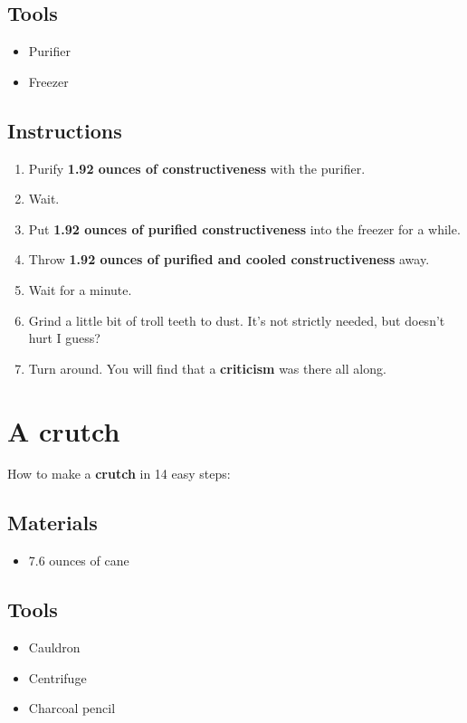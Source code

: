 \documentclass{article}
\begin{document}
\subsection{Tools}\begin{itemize}
\item 
Purifier
\item 
Freezer
\end{itemize}
\subsection{Instructions}\begin{enumerate}
\item 
Purify \textbf{1.92 ounces of constructiveness} with the purifier.
\item 
Wait.
\item 
Put \textbf{1.92 ounces of purified constructiveness} into the freezer for a while.
\item 
Throw \textbf{1.92 ounces of purified and cooled constructiveness} away.
\item 
Wait for a minute.
\item 
Grind a little bit of troll teeth to dust. It's not strictly needed, but doesn't hurt I guess?
\item 
Turn around. You will find that a \textbf{criticism} was there all along.
\end{enumerate}
\newpage
\section{A crutch}How to make a \textbf{crutch} in 14 easy steps:

\subsection{Materials}\begin{itemize}
\item 
7.6 ounces of cane
\end{itemize}
\subsection{Tools}\begin{itemize}
\item 
Cauldron
\item 
Centrifuge
\item 
Charcoal pencil
\end{itemize}
\end{document}
